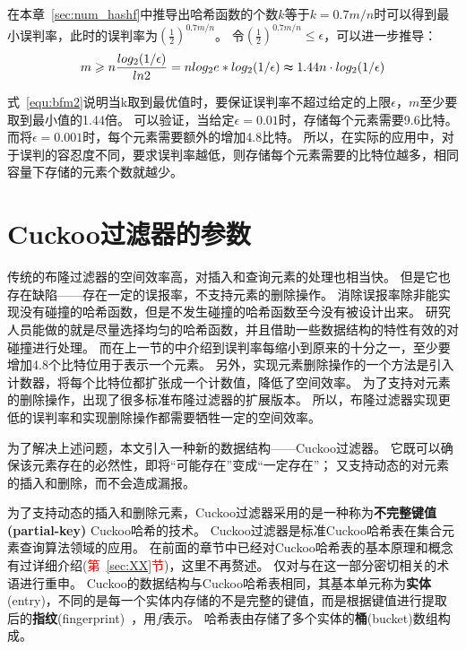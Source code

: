 在本章~\ref{sec:num_hashf}中推导出哈希函数的个数$k$等于$k = 0.7{m/n}$时可以得到最小误判率，此时的误判率为$(\frac{1}{2})^{0.7{m/n}}$。
令$(\frac{1}{2})^{0.7{m/n}} \leq \epsilon $，可以进一步推导：
\begin{equation}
m \geq n\frac{log_2({1/\epsilon})}{ln2} = nlog_2e\ast log_2({1/\epsilon}) \thickapprox 1.44n\cdot log_2({1/\epsilon})
\label{equ:bfm2}
\end{equation}

式~\ref{equ:bfm2}说明当k取到最优值时，要保证误判率不超过给定的上限$\epsilon$，$m$至少要取到最小值的1.44倍。
可以验证，当给定$\epsilon = 0.01$时，存储每个元素需要9.6比特。
而将$\epsilon = 0.001 $时，每个元素需要额外的增加4.8比特。
所以，在实际的应用中，对于误判的容忍度不同，要求误判率越低，则存储每个元素需要的比特位越多，相同容量下存储的元素个数就越少。

\section{Cuckoo过滤器的参数}
\label{sec:cbf_para}
传统的布隆过滤器的空间效率高，对插入和查询元素的处理也相当快。
但是它也存在缺陷——存在一定的误报率，不支持元素的删除操作。
消除误报率除非能实现没有碰撞的哈希函数，但是不发生碰撞的哈希函数至今没有被设计出来。
研究人员能做的就是尽量选择均匀的哈希函数，并且借助一些数据结构的特性有效的对碰撞进行处理。
而在上一节的中介绍到误判率每缩小到原来的十分之一，至少要增加4.8个比特位用于表示一个元素。
另外，实现元素删除操作的一个方法是引入计数器，将每个比特位都扩张成一个计数值，降低了空间效率。
为了支持对元素的删除操作，出现了很多标准布隆过滤器的扩展版本\cite{bender2012don,bonomi2006improved,fan2000summary}。
所以，布隆过滤器实现更低的误判率和实现删除操作都需要牺牲一定的空间效率。

为了解决上述问题，本文引入一种新的数据结构——Cuckoo过滤器。
它既可以确保该元素存在的必然性，即将“可能存在”变成“一定存在”；
又支持动态的对元素的插入和删除，而不会造成漏报。

为了支持动态的插入和删除元素，Cuckoo过滤器采用的是一种称为\textbf{不完整键值(partial-key)} Cuckoo哈希的技术。
Cuckoo过滤器是标准Cuckoo哈希表在集合元素查询算法领域的应用。
在前面的章节中已经对Cuckoo哈希表的基本原理和概念有过详细介绍(\textcolor{red}{第~\ref{sec:XX}节})，这里不再赘述。
仅对与在这一部分密切相关的术语进行重申。
Cuckoo的数据结构与Cuckoo哈希表相同，其基本单元称为\textbf{实体}(entry)，不同的是每一个实体内存储的不是完整的键值，而是根据键值进行提取后的\textbf{指纹}(fingerprint)~\cite{memc3}，用$f$表示。
哈希表由存储了多个实体的\textbf{桶}(bucket)数组构成。

